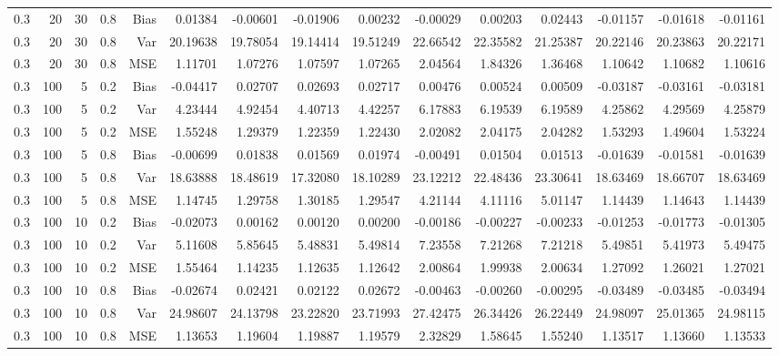 \begin{table}[!htbp]
\begin{tabular}{lrrrrrrrrrrrrrr}
0.3 &  20 & 30 & 0.8 & Bias & 0.01384 & -0.00601 & -0.01906 & 0.00232 & -0.00029 & 0.00203 & 0.02443 & -0.01157 & -0.01618 & -0.01161 \\
0.3 &  20 & 30 & 0.8 & Var & 20.19638 & 19.78054 & 19.14414 & 19.51249 & 22.66542 & 22.35582 & 21.25387 & 20.22146 & 20.23863 & 20.22171 \\
0.3 &  20 & 30 & 0.8 & MSE & 1.11701 & 1.07276 & 1.07597 & 1.07265 & 2.04564 & 1.84326 & 1.36468 & 1.10642 & 1.10682 & 1.10616 \\
0.3 & 100 &  5 & 0.2 & Bias & -0.04417 & 0.02707 & 0.02693 & 0.02717 & 0.00476 & 0.00524 & 0.00509 & -0.03187 & -0.03161 & -0.03181 \\
0.3 & 100 &  5 & 0.2 & Var & 4.23444 & 4.92454 & 4.40713 & 4.42257 & 6.17883 & 6.19539 & 6.19589 & 4.25862 & 4.29569 & 4.25879 \\
0.3 & 100 &  5 & 0.2 & MSE & 1.55248 & 1.29379 & 1.22359 & 1.22430 & 2.02082 & 2.04175 & 2.04282 & 1.53293 & 1.49604 & 1.53224 \\
0.3 & 100 &  5 & 0.8 & Bias & -0.00699 & 0.01838 & 0.01569 & 0.01974 & -0.00491 & 0.01504 & 0.01513 & -0.01639 & -0.01581 & -0.01639 \\
0.3 & 100 &  5 & 0.8 & Var & 18.63888 & 18.48619 & 17.32080 & 18.10289 & 23.12212 & 22.48436 & 23.30641 & 18.63469 & 18.66707 & 18.63469 \\
0.3 & 100 &  5 & 0.8 & MSE & 1.14745 & 1.29758 & 1.30185 & 1.29547 & 4.21144 & 4.11116 & 5.01147 & 1.14439 & 1.14643 & 1.14439 \\
0.3 & 100 & 10 & 0.2 & Bias & -0.02073 & 0.00162 & 0.00120 & 0.00200 & -0.00186 & -0.00227 & -0.00233 & -0.01253 & -0.01773 & -0.01305 \\
0.3 & 100 & 10 & 0.2 & Var & 5.11608 & 5.85645 & 5.48831 & 5.49814 & 7.23558 & 7.21268 & 7.21218 & 5.49851 & 5.41973 & 5.49475 \\
0.3 & 100 & 10 & 0.2 & MSE & 1.55464 & 1.14235 & 1.12635 & 1.12642 & 2.00864 & 1.99938 & 2.00634 & 1.27092 & 1.26021 & 1.27021 \\
0.3 & 100 & 10 & 0.8 & Bias & -0.02674 & 0.02421 & 0.02122 & 0.02672 & -0.00463 & -0.00260 & -0.00295 & -0.03489 & -0.03485 & -0.03494 \\
0.3 & 100 & 10 & 0.8 & Var & 24.98607 & 24.13798 & 23.22820 & 23.71993 & 27.42475 & 26.34426 & 26.22449 & 24.98097 & 25.01365 & 24.98115 \\
0.3 & 100 & 10 & 0.8 & MSE & 1.13653 & 1.19604 & 1.19887 & 1.19579 & 2.32829 & 1.58645 & 1.55240 & 1.13517 & 1.13660 & 1.13533 \\

\end{tabular}
\end{table}
